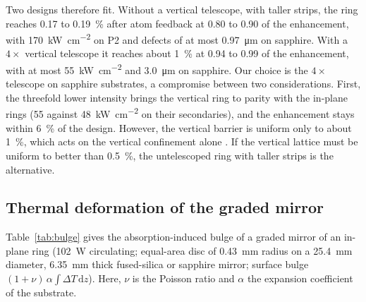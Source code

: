 \documentclass[11pt]{article}
\begin{document}
Two designs therefore fit. Without a vertical telescope, with taller strips, the ring reaches 0.17 to
\SI{0.19}{\percent} after atom feedback at 0.80 to 0.90 of the enhancement, with
\SI{170}{\kilo\watt\per\centi\metre\squared} on P2 and defects of at most \SI{0.97}{\micro\metre} on sapphire.
With a $4\times$ vertical telescope it reaches about \SI{1}{\percent} at 0.94 to 0.99 of the enhancement, with
at most \SI{55}{\kilo\watt\per\centi\metre\squared} and \SI{3.0}{\micro\metre} on sapphire. Our choice is the
$4\times$ telescope on sapphire substrates, a compromise between two considerations. First, the threefold
lower intensity brings the vertical ring to parity with the in-plane rings (55 against
\SI{48}{\kilo\watt\per\centi\metre\squared} on their secondaries), and the enhancement stays within
\SI{6}{\percent} of the design. However, the vertical barrier is uniform only to about \SI{1}{\percent}, which acts on the vertical
confinement alone . If the vertical lattice
must be uniform to better than \SI{0.5}{\percent}, the untelescoped ring with taller strips is the
alternative.

\subsection{Thermal deformation of the graded mirror}

Table~\ref{tab:bulge} gives the absorption-induced bulge of a graded mirror of an in-plane ring
(\SI{102}{\watt} circulating; equal-area disc of \SI{0.43}{\milli\metre} radius on a \SI{25.4}{\milli\metre}
diameter, \SI{6.35}{\milli\metre} thick fused-silica or sapphire mirror; surface bulge
$(1+\nu)\,\alpha \int \Delta T\, \mathrm{d}z$). Here, $\nu$ is the Poisson ratio and $\alpha$ the
expansion coefficient of the substrate.
\end{document}
